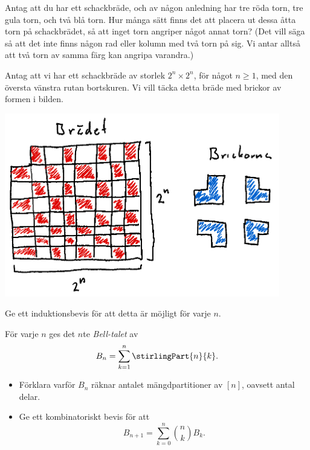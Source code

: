 \documentclass[nobib]{tufte-handout}
\begin{document}
\begin{xca}
  Antag att du har ett schackbräde, och av någon anledning har tre röda torn, tre gula torn, och två blå torn. Hur många sätt finns det att placera ut dessa åtta torn på schackbrädet, så att inget torn angriper något annat torn? (Det vill säga så att det inte finns någon rad eller kolumn med två torn på sig. Vi antar alltså att två torn av samma färg kan angripa varandra.)
\end{xca}


\begin{xca}
  Antag att vi har ett schackbräde av storlek $2^n \times 2^n$, för något $n\geq 1$, med den översta vänstra rutan bortskuren. Vi vill täcka detta bräde med brickor av formen i bilden.

  \includegraphics[width=0.9\textwidth]{graphics/chessboard_induction_extra_exercise.png}

  Ge ett induktionsbevis för att detta är möjligt för varje $n$.
\end{xca}

\begin{xca}
  För varje $n$ ges det $n$te \emph{Bell-talet} av
  $$B_n = \sum_{k=1}^{n} \stirlingPart{n}{k}.$$

  \begin{itemize}
    \item Förklara varför $B_n$ räknar antalet mängdpartitioner av $[n]$, oavsett antal delar.
    \item Ge ett kombinatoriskt bevis för att
    $$B_{n+1} = \sum_{k=0}^{n} \binom{n}{k} B_k.$$
  \end{itemize}
\end{xca}
\end{document}
